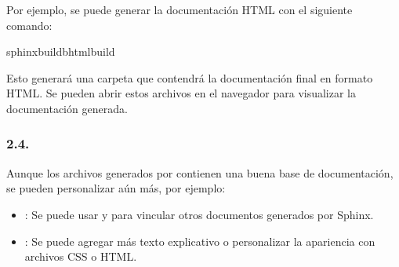 \documentclass[a4paper,10pt,oneside,spanish,openany]{sphinxmanual}
\begin{document}
\sphinxAtStartPar
Por ejemplo, se puede generar la documentación HTML con el siguiente comando:

\begin{sphinxVerbatim}[commandchars=\\\{\}]
sphinx\PYGZhy{}build\PYGZhy{}bhtmlbuild
\end{sphinxVerbatim}

\sphinxAtStartPar
Esto generará una carpeta  que contendrá la documentación final en formato HTML. Se pueden abrir estos archivos en el navegador para visualizar la documentación generada.


\subsubsection{2.4. }
\label{\detokenize{configuracion_inicial/007.Creacion_de_ficheros_de_codigo_y_generacion_automatica_de_documentacion:personalizacion-de-la-documentacion-generada}}
\sphinxAtStartPar
Aunque los archivos generados por  contienen una buena base de documentación, se pueden personalizar aún más, por ejemplo:
\begin{itemize}
\item {} 
\sphinxAtStartPar
{}: Se puede usar  y  para vincular otros documentos generados por Sphinx.

\item {} 
\sphinxAtStartPar
{}: Se puede agregar más texto explicativo o personalizar la apariencia con archivos CSS o HTML.

\end{itemize}
\end{document}
